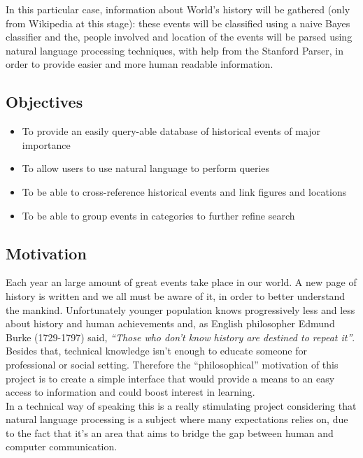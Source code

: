 \documentclass{llncs}
\begin{document}
In this particular case, information about World's history will be gathered (only from Wikipedia at this stage): these events will be classified using a naive Bayes classifier and the, people involved and location of the events will be parsed using natural language processing techniques, with help from the Stanford Parser, in order to provide easier and more human readable information.\\

\subsection{Objectives}

\begin{itemize}
	\item To provide an easily query-able database of historical events of major importance
	\item To allow users to use natural language to perform queries
	\item To be able to cross-reference historical events and link figures and locations
	\item To be able to group events in categories to further refine search
\end{itemize}

\subsection{Motivation}

Each year an large amount of great events take place in our world. A new page of history is written and we all must be aware of it, in order to better understand the mankind. Unfortunately younger population knows progressively less and less about history and human achievements and, as English philosopher Edmund Burke (1729-1797) said, \textit{``Those who don't know history are destined to repeat it''}. Besides that, technical knowledge isn't enough to educate someone for professional or social setting.
Therefore the ``philosophical'' motivation of this project is to create a simple interface that would provide a means to an easy access to information and could boost interest in learning.\\

In a technical way of speaking this is a really stimulating project considering that natural language processing is a subject where many expectations relies on, due to the fact that it's an area that aims to bridge the gap between human and computer communication.
\end{document}
